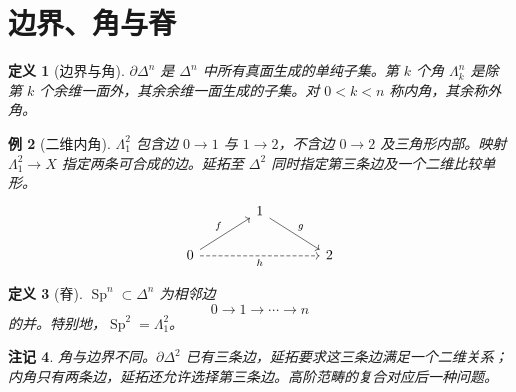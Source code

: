 \documentclass[12pt,oneside,openany,fontset=none]{ctexbook}
\theoremstyle{cn}
\newtheorem{definition}{定义}[chapter]
\newtheorem{example}[definition]{例}
\newtheorem{remark}[definition]{注记}
\numberwithin{equation}{chapter}
\begin{document}
\section{边界、角与脊}
\begin{definition}[边界与角]
$\partial\Delta^n$ 是 $\Delta^n$ 中所有真面生成的单纯子集。第 $k$ 个角 $\Lambda_k^n$ 是除第 $k$ 个余维一面外，其余余维一面生成的子集。对 $0<k<n$ 称内角，其余称外角。
\end{definition}
\begin{example}[二维内角]
$\Lambda_1^2$ 包含边 $0\to1$ 与 $1\to2$，不含边 $0\to2$ 及三角形内部。映射 $\Lambda_1^2\to X$ 指定两条可合成的边。延拓至 $\Delta^2$ 同时指定第三条边及一个二维比较单形。
\[
\begin{tikzcd}[column sep=large]
&1\ar[dr,"g"]&\\
0\ar[ur,"f"]\ar[rr,dashed,"h"']&&2
\end{tikzcd}
\]
\end{example}
\begin{definition}[脊]
$\operatorname{Sp}^n\subset\Delta^n$ 为相邻边
\[
0\longrightarrow1\longrightarrow\cdots\longrightarrow n
\]
的并。特别地，$\operatorname{Sp}^2=\Lambda_1^2$。
\end{definition}
\begin{remark}
角与边界不同。$\partial\Delta^2$ 已有三条边，延拓要求这三条边满足一个二维关系；内角只有两条边，延拓还允许选择第三条边。高阶范畴的复合对应后一种问题。
\end{remark}
\end{document}
